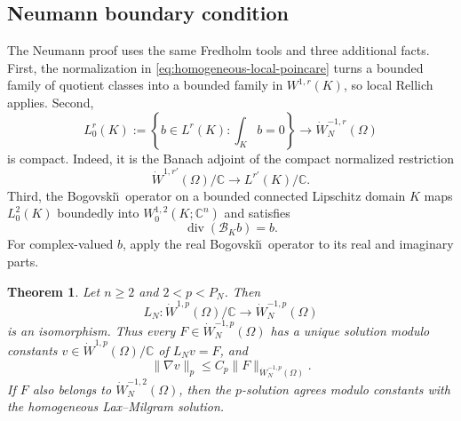 \documentclass[12pt]{amsart}
\newcommand{\diver}{\operatorname{div}}
\newtheorem{theorem}{Theorem}[section]
\theoremstyle{remark}
\begin{document}
\subsection{Neumann boundary condition}

The Neumann proof uses the same Fredholm tools and three additional facts.
First, the normalization in \eqref{eq:homogeneous-local-poincare} turns a
bounded family of quotient classes into a bounded family in
\(W^{1,r}(K)\), so local Rellich applies.  Second,
\[
 L^r_0(K):=\left\{b\in L^r(K):\int_Kb=0\right\}
 \longrightarrow\dot W^{-1,r}_N(\Omega)
\]
is compact.  Indeed, it is the Banach adjoint of the compact normalized
restriction
\[
 \dot W^{1,r'}(\Omega)/\mathbb C
 \longrightarrow L^{r'}(K)/\mathbb C.
\]
Third, the Bogovski\u\i\ operator on a bounded connected Lipschitz domain
\(K\) maps \(L^2_0(K)\) boundedly into \(W^{1,2}_0(K;\mathbb C^n)\) and
satisfies \cite[Theorem~2.5]{GeissertHeckHieber06}
\[
 \diver(\mathcal B_Kb)=b.
\]
For complex-valued \(b\), apply the real Bogovski\u\i\ operator to its
real and imaginary parts.

\begin{theorem}
\label{thm:neumann-exterior-inverse}
Let \(n\geq2\) and \(2<p<P_N\).  Then
\[
 L_N:\dot W^{1,p}(\Omega)/\mathbb C
 \longrightarrow\dot W^{-1,p}_N(\Omega)
\]
is an isomorphism.  Thus every \(F\in\dot W^{-1,p}_N(\Omega)\) has a
unique solution modulo constants \(v\in\dot W^{1,p}(\Omega)/\mathbb C\)
of \(L_Nv=F\), and
\[
 \|\nabla v\|_p\leq C_p\|F\|_{\dot W^{-1,p}_N(\Omega)}.
\]
If \(F\) also belongs to \(\dot W^{-1,2}_N(\Omega)\), then the
\(p\)-solution agrees modulo constants with the homogeneous Lax--Milgram
solution.
\end{theorem}
\end{document}
